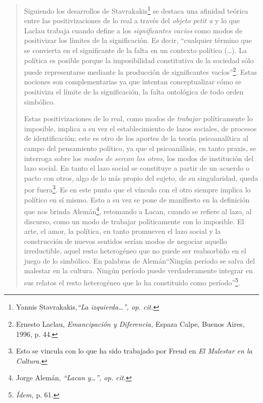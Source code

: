 \begin{quote}
Siguiendo los desarrollos de Stavrakakis\footnote{Yannis Stavrakakis,\emph{\enquote{La izquierda\ldots}, op. cit.}} se destaca una afinidad teórica entre las positivizaciones de lo real a través del \emph{objeto petit a} y lo que Laclau trabaja cuando define a los \emph{significantes vacíos} como modos de positivizar los límites de la significación. Es decir, \enquote{cualquier término que se convierta en el significante de la falta en un contexto político (\dots). La política es posible porque la imposibilidad constitutiva de la sociedad sólo puede representarse mediante la producción de significantes vacíos}\footnote{Ernesto Laclau, \emph{Emancipación y Diferencia,} Espaza Calpe, Buenos Aires, 1996, p. 44.}. Estas nociones son complementarias ya que intentan conceptualizar cómo se positiviza el límite de la significación, la falta ontológica de todo orden simbólico.

Estas positivizaciones de lo real, como modos de \emph{trabajar} políticamente lo imposible, implica a su vez el establecimiento de lazos sociales, de procesos de identificación; este es otro de los aportes de la teoría psicoanalítica al campo del pensamiento político, ya que el psicoanálisis, en tanto praxis, se interroga sobre los \emph{modos de sercon los otros,} los modos de institución del lazo social. En tanto el lazo social se constituye a partir de un acuerdo o pacto con otros, algo de lo más propio del sujeto, de su singularidad, queda por fuera\footnote{Esto se vincula con lo que ha sido trabajado por Freud en \emph{El Malestar en la Cultura.}}. Es en este punto que el vínculo con el otro siempre implica lo político en sí mismo. Esto a su vez se pone de manifiesto en la definición que nos brinda Alemán\footnote{Jorge Alemán, \emph{\enquote{Lacan y\ldots}, op. cit.}}, retomando a Lacan, cuando se refiere al lazo, al discurso, como un modo de trabajar políticamente con lo imposible. El arte, el amor, la política, en tanto promueven el lazo social y la construcción de nuevos sentidos serían modos de negociar aquello irreductible, aquel resto heterogéneo que no puede ser reabsorbido en el juego de lo simbólico. En palabras de Alemán\enquote{Ningún período se salva del malestar en la cultura. Ningún período puede verdaderamente integrar en sus relatos el resto heterogéneo que lo ha constituido como período}\footnote{\emph{Ídem,} p. 61.}.


\end{quote}
